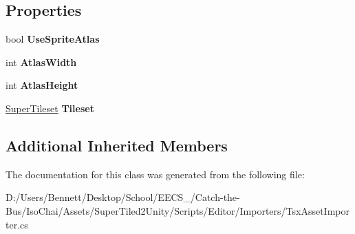 \subsection*{Properties}
\begin{DoxyCompactItemize}
\item 
\mbox{\label{class_super_tiled2_unity_1_1_editor_1_1_tsx_asset_importer_ab4037f8c28a1156d6829ea78d9d40c95}} 
bool {\bfseries Use\+Sprite\+Atlas}
\item 
\mbox{\label{class_super_tiled2_unity_1_1_editor_1_1_tsx_asset_importer_a26b128b209a90e4a3d1ff14a67816e3a}} 
int {\bfseries Atlas\+Width}
\item 
\mbox{\label{class_super_tiled2_unity_1_1_editor_1_1_tsx_asset_importer_a93c256e6dce24bb6fe591d02a4e59661}} 
int {\bfseries Atlas\+Height}
\item 
\mbox{\label{class_super_tiled2_unity_1_1_editor_1_1_tsx_asset_importer_a82d8fcfe6433e127c735f7645aaafe05}} 
\mbox{\hyperlink{class_super_tiled2_unity_1_1_editor_1_1_super_tileset}{Super\+Tileset}} {\bfseries Tileset}
\end{DoxyCompactItemize}
\subsection*{Additional Inherited Members}


The documentation for this class was generated from the following file\+:\begin{DoxyCompactItemize}
\item 
D\+:/\+Users/\+Bennett/\+Desktop/\+School/\+E\+E\+C\+S\+\_/\+Catch-\/the-\/\+Bus/\+Iso\+Chai/\+Assets/\+Super\+Tiled2\+Unity/\+Scripts/\+Editor/\+Importers/Tsx\+Asset\+Importer.\+cs\end{DoxyCompactItemize}

